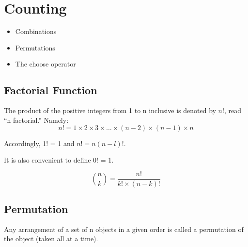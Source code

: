 \documentclass[12pt]{article}
\begin{document}
\section{Counting}
\begin{itemize}
\item Combinations
\item Permutations
\item The choose operator
\end{itemize}

\subsection*{Factorial Function}
The product of the positive integers from 1 to n inclusive is denoted by $n!$, read “n factorial.” Namely:
\[n! = 1 \times 2 \times 3 \times \ldots \times (n−2) \times(n−1)\times n\] 

Accordingly, 1! = 1 and $n! = n(n − l)!$. 

It is also convenient to define 0! = 1.


\[ {n \choose k} = \frac{n!}{k! \times (n-k)!} \]


\subsection*{Permutation}
Any arrangement of a set of n objects in a given order is called a permutation of the object (taken all at a time).

\newpage
\end{document}
